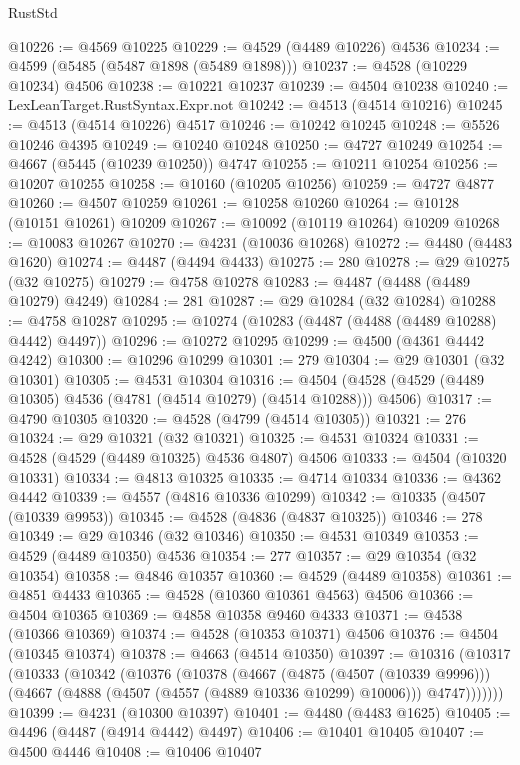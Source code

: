 \begin{lexlean}{RustStd}
\begin{coremodule}
@10226 := @4569 @10225
@10229 := @4529 (@4489 @10226) @4536
@10234 := @4599 (@5485 (@5487 @1898 (@5489 @1898)))
@10237 := @4528 (@10229 @10234) @4506
@10238 := @10221 @10237
@10239 := @4504 @10238
@10240 := LexLeanTarget.RustSyntax.Expr.not
@10242 := @4513 (@4514 @10216)
@10245 := @4513 (@4514 @10226) @4517
@10246 := @10242 @10245
@10248 := @5526 @10246 @4395
@10249 := @10240 @10248
@10250 := @4727 @10249
@10254 := @4667 (@5445 (@10239 @10250)) @4747
@10255 := @10211 @10254
@10256 := @10207 @10255
@10258 := @10160 (@10205 @10256)
@10259 := @4727 @4877
@10260 := @4507 @10259
@10261 := @10258 @10260
@10264 := @10128 (@10151 @10261) @10209
@10267 := @10092 (@10119 @10264) @10209
@10268 := @10083 @10267
@10270 := @4231 (@10036 @10268)
@10272 := @4480 (@4483 @1620)
@10274 := @4487 (@4494 @4433)
@10275 := 280
@10278 := @29 @10275 (@32 @10275)
@10279 := @4758 @10278
@10283 := @4487 (@4488 (@4489 @10279) @4249)
@10284 := 281
@10287 := @29 @10284 (@32 @10284)
@10288 := @4758 @10287
@10295 := @10274 (@10283 (@4487 (@4488 (@4489 @10288) @4442) @4497))
@10296 := @10272 @10295
@10299 := @4500 (@4361 @4442 @4242)
@10300 := @10296 @10299
@10301 := 279
@10304 := @29 @10301 (@32 @10301)
@10305 := @4531 @10304
@10316 := @4504 (@4528 (@4529 (@4489 @10305) @4536 (@4781 (@4514 @10279) (@4514 @10288))) @4506)
@10317 := @4790 @10305
@10320 := @4528 (@4799 (@4514 @10305))
@10321 := 276
@10324 := @29 @10321 (@32 @10321)
@10325 := @4531 @10324
@10331 := @4528 (@4529 (@4489 @10325) @4536 @4807) @4506
@10333 := @4504 (@10320 @10331)
@10334 := @4813 @10325
@10335 := @4714 @10334
@10336 := @4362 @4442
@10339 := @4557 (@4816 @10336 @10299)
@10342 := @10335 (@4507 (@10339 @9953))
@10345 := @4528 (@4836 (@4837 @10325))
@10346 := 278
@10349 := @29 @10346 (@32 @10346)
@10350 := @4531 @10349
@10353 := @4529 (@4489 @10350) @4536
@10354 := 277
@10357 := @29 @10354 (@32 @10354)
@10358 := @4846 @10357
@10360 := @4529 (@4489 @10358)
@10361 := @4851 @4433
@10365 := @4528 (@10360 @10361 @4563) @4506
@10366 := @4504 @10365
@10369 := @4858 @10358 @9460 @4333
@10371 := @4538 (@10366 @10369)
@10374 := @4528 (@10353 @10371) @4506
@10376 := @4504 (@10345 @10374)
@10378 := @4663 (@4514 @10350)
@10397 := @10316
    (@10317
      (@10333
        (@10342
          (@10376
            (@10378
              (@4667
                (@4875 (@4507 (@10339 @9996)))
                (@4667 (@4888 (@4507 (@4557 (@4889 @10336 @10299) @10006))) @4747)))))))
@10399 := @4231 (@10300 @10397)
@10401 := @4480 (@4483 @1625)
@10405 := @4496 (@4487 (@4914 @4442) @4497)
@10406 := @10401 @10405
@10407 := @4500 @4446
@10408 := @10406 @10407

\end{coremodule}
\end{lexlean}
